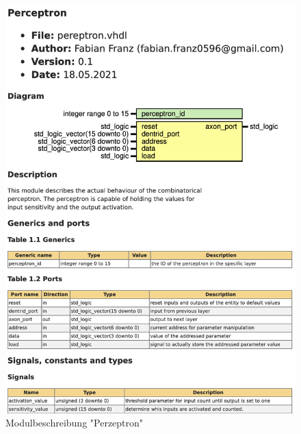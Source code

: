 \documentclass{article}
\numberwithin{equation}{section}
\begin{document}
\begin{figure}[htb!]
    \begin{center}
      \includegraphics[width=13.25cm]{ModuleDescription/perceptron.png}
    \end{center}
    \caption{Modulbeschreibung "Perzeptron"} \label{fig:perceptron}
  \end{figure}
\FloatBarrier
\end{document}
